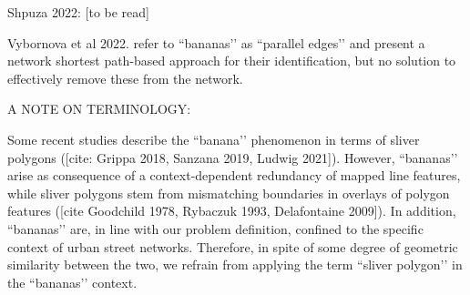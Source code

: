 Shpuza 2022: [to be read]


Vybornova et al 2022. refer to ``bananas’’ as ``parallel edges’’ and present a network shortest path-based approach for their identification, but no solution to effectively remove these from the network.


A NOTE ON TERMINOLOGY:


Some recent studies describe the ``banana’’ phenomenon in terms of sliver polygons ([cite: Grippa 2018, Sanzana 2019, Ludwig 2021]). However, ``bananas’’ arise as consequence of a context-dependent redundancy of mapped line features, while sliver polygons stem from mismatching boundaries in overlays of polygon features ([cite Goodchild 1978, Rybaczuk 1993, Delafontaine 2009]). In addition, ``bananas’’ are, in line with our problem definition, confined to the specific context of urban street networks. Therefore, in spite of some degree of geometric similarity between the two, we refrain from applying the term ``sliver polygon’’ in the ``bananas’’ context.